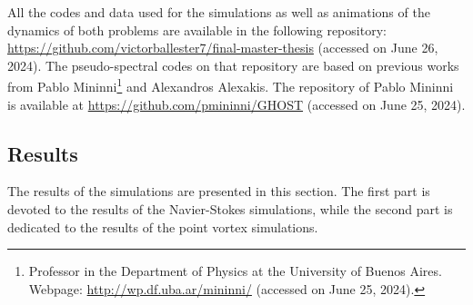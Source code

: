 \documentclass[../main.tex]{subfiles}
\begin{document}
\newcommand{\theoldfootnote}{\thefootnote}
\renewcommand{\thefootnote}{\fnsymbol{footnote}}
All the codes and data used for the simulations as well as animations of the dynamics of both problems are available in the following repository: \url{https://github.com/victorballester7/final-master-thesis} (accessed on June 26, 2024). The pseudo-spectral codes on that repository are based on previous works from Pablo Mininni\footnote[3]{Professor in the Department of Physics at the University of Buenos Aires. Webpage: \url{http://wp.df.uba.ar/mininni/} (accessed on June 25, 2024).} and Alexandros Alexakis. The repository of Pablo Mininni is available at \url{https://github.com/pmininni/GHOST} (accessed on June 25, 2024).
\renewcommand{\thefootnote}{\theoldfootnote}
\subsection{Results}\label{sec:results}
The results of the simulations are presented in this section. The first part is devoted to the results of the Navier-Stokes simulations, while the second part is dedicated to the results of the point vortex simulations.
\end{document}
